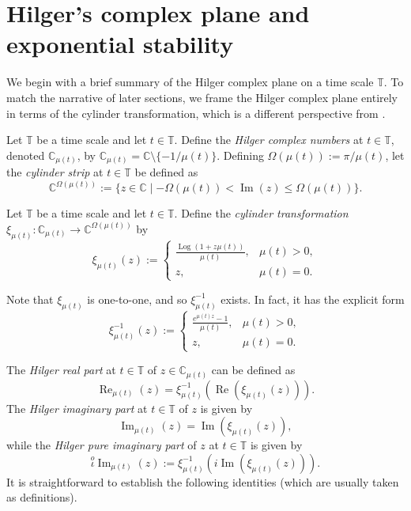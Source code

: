 \documentclass[reqno]{amsart}
\DeclareMathOperator{\myRe}{Re}
\DeclareMathOperator{\myIm}{Im}
\begin{document}
\section{Hilger's complex plane and exponential stability}

We begin with a brief summary of the Hilger complex plane \cite{BoPeD} on a time
scale $\mathbb{T}$. To match the narrative of later sections, we frame the Hilger
complex plane entirely in terms of the cylinder transformation, which is a different
perspective from \cite{BoPeD}.

Let $\mathbb{T}$ be a time scale and let $t \in \mathbb{T}$. Define the \emph{Hilger complex numbers}
at $t\in\mathbb{T}$, denoted $\mathbb{C}_{\mu(t)}$, by $\mathbb{C}_{\mu(t)} = \mathbb{C} \setminus \{-1/\mu(t)\}$. Defining $\Omega(\mu(t)) := \pi/\mu(t)$, let the \emph{cylinder strip} at $t\in\mathbb{T}$ be defined as
\[
\mathbb{C}^{\Omega(\mu(t))} := \{z \in \mathbb{C} \mid -\Omega(\mu(t)) < \myIm(z) \leq \Omega(\mu(t)) \}.
\]
\begin{definition} \rm
Let $\mathbb{T}$ be a time scale and let $t \in \mathbb{T}$. Define the
\emph{cylinder transformation} $\xi_{\mu(t)}:\mathbb{C}_{\mu(t)} \to \mathbb{C}^{\Omega(\mu(t))}$ by
 \begin{equation}\label{cyl}
 \xi_{\mu(t)}(z):=
 \begin{cases}
 \frac{\operatorname{Log}(1+z \mu(t))}{\mu(t)}, & \mu(t)>0,\\
 z, & \mu(t)=0.
 \end{cases}
 \end{equation}
\end{definition}

Note that $\xi_{\mu(t)}$ is one-to-one, and so $\xi_{\mu(t)}^{-1}$ exists.
In fact, it has the explicit form
\begin{equation}\label{invcyl}
 \xi_{\mu(t)}^{-1}(z):=
 \begin{cases}
 \frac{e^{\mu(t) z} -1}{\mu(t)}, & \mu(t)>0,\\
 z, & \mu(t)=0.
 \end{cases}
 \end{equation}

The \emph{Hilger real part} at $t\in\mathbb{T}$ of $z \in \mathbb{C}_{\mu(t)}$ can be defined as
 $$
 \myRe_{\mu(t)}(z)= \xi_{\mu(t)}^{-1}(\myRe(\xi_{\mu(t)}(z))).
 $$
The \emph{Hilger imaginary part} at $t \in \mathbb{T}$ of $z$ is given by
 $$
 \myIm_{\mu(t)}(z) = \myIm(\xi_{\mu(t)}(z)),
 $$
while the \emph{Hilger pure imaginary part} of $z$ at $t \in \mathbb{T}$ is given by
 $$
 \stackrel{o}{\iota} \myIm_{\mu(t)}(z) := \xi^{-1}_{\mu(t)}( i \myIm(\xi_{\mu(t)}(z))).
 $$
It is straightforward to establish the following identities (which are usually taken as definitions).
\end{document}
